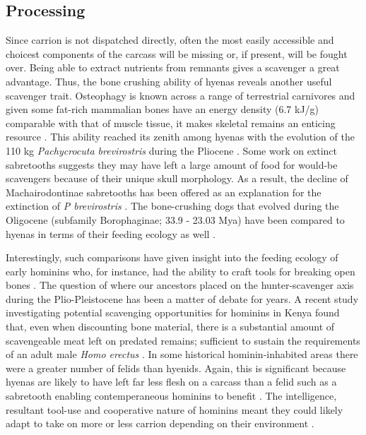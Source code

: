 \documentclass[a4paper,12pt]{article}
\begin{document}
\subsection*{Processing}
Since carrion is not dispatched directly, often the most easily accessible and choicest components of the carcass will be missing or, if present, will be fought over.
Being able to extract nutrients from remnants gives a scavenger a great advantage.
Thus, the bone crushing ability of hyenas reveals another useful scavenger trait.
Osteophagy is known across a range of terrestrial carnivores and given some fat-rich mammalian bones have an energy density (6.7 kJ/g) comparable with that of muscle tissue, it makes skeletal remains an enticing resource \citep{brown1989study}.
This ability reached its zenith among hyenas with the evolution of the 110 kg \textit{Pachycrocuta brevirostris} during the Pliocene \citep[3.6 - 2.58 Mya; ][]{palmqvist2011giant}.
Some work on extinct sabretooths suggests they may have left a large amount of food for would-be scavengers because of their unique skull morphology.
As a result, the decline of Machairodontinae sabretooths has been offered as an explanation for the extinction of \textit{P brevirostris} \citep{palmqvist2011giant}.
The bone-crushing dogs that evolved during the Oligocene (subfamily Borophaginae; 33.9 - 23.03 Mya) have been compared to hyenas in terms of their feeding ecology as well \citep{van2003chapter,martin2016pursuit}.


Interestingly, such comparisons have given insight into the feeding ecology of early hominins who, for instance, had the ability to craft tools for breaking open bones \citep{ARCM:ARCM12084}.
The question of where our ancestors placed on the hunter-scavenger axis during the Plio-Pleistocene has been a matter of debate for years.
A recent study investigating potential scavenging opportunities for hominins in Kenya found that, even when discounting bone material, there is a substantial amount of scavengeable meat left on predated remains; sufficient to sustain the requirements of an adult male \textit{Homo erectus} \citep{pobiner2015new}.
In some historical hominin-inhabited areas there were a greater number of felids than hyenids.
Again, this is significant because hyenas are likely to have left far less flesh on a carcass than a felid such as a sabretooth enabling contemperaneous hominins to benefit \citep{pobiner2015new}.
The intelligence, resultant tool-use and cooperative nature of hominins meant they could likely adapt to take on more or less carrion depending on their environment \citep{moleon2014humans}.
\end{document}
